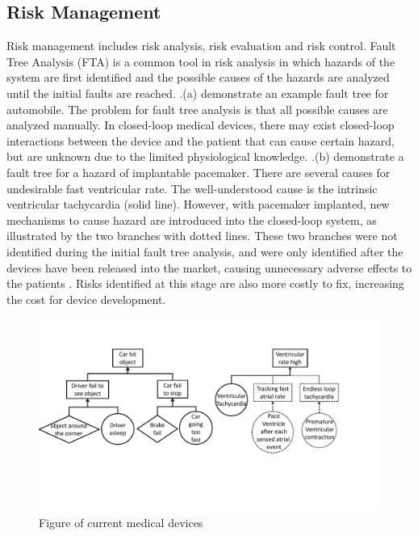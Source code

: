 \subsection{Risk Management}
Risk management includes risk analysis, risk evaluation and risk control. Fault Tree Analysis (FTA) is a common tool in risk analysis in which hazards of the system are first identified and the possible causes of the hazards are analyzed until the initial faults are reached. .(a) demonstrate an example fault tree for automobile. The problem for fault tree analysis is that all possible causes are analyzed manually. In closed-loop medical devices, there may exist closed-loop interactions between the device and the patient that can cause certain hazard, but are unknown due to the limited physiological knowledge. .(b) demonstrate a fault tree for a hazard of implantable pacemaker. There are several causes for undesirable fast ventricular rate. The well-understood cause is the intrinsic ventricular tachycardia (solid line). However, with pacemaker implanted, new mechanisms to cause hazard are introduced into the closed-loop system, as illustrated by the two branches with dotted lines. These two branches were not identified during the initial fault tree analysis, and were only identified after the devices have been released into the market, causing unnecessary adverse effects to the patients \cite{ELT}. Risks identified at this stage are also more costly to fix, increasing the cost for device development. 
\begin{figure}[t]
		\centering
		\includegraphics[width=\textwidth]{figs/fta_new.pdf}
		\caption{\small Figure of current medical devices}
		\label{fig:risks}
\end{figure}

